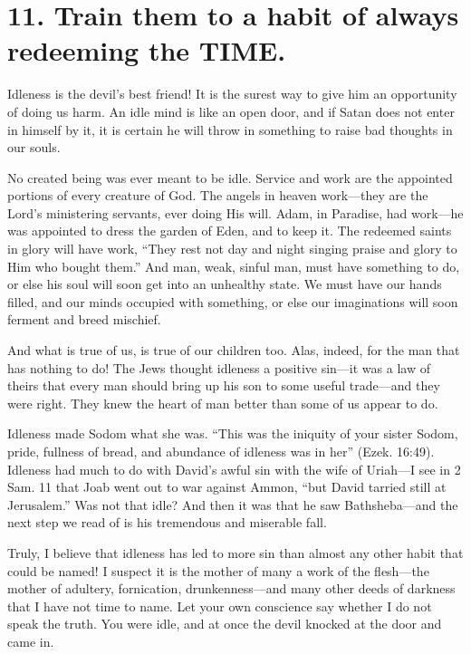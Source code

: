 \documentclass[
]{book}
\begin{document}
\hypertarget{train-them-to-a-habit-of-always-redeeming-the-time.}{%
\section*{11. Train them to a habit of always redeeming the TIME.}\label{train-them-to-a-habit-of-always-redeeming-the-time.}}

Idleness is the devil's best friend! It is the surest way to give him an opportunity of doing us harm. An idle mind is like an open door, and if Satan does not enter in himself by it, it is certain he will throw in something to raise bad thoughts in our souls.

No created being was ever meant to be idle. Service and work are the appointed portions of every creature of God. The angels in heaven work---they are the Lord's ministering servants, ever doing His will. Adam, in Paradise, had work---he was appointed to dress the garden of Eden, and to keep it. The redeemed saints in glory will have work, ``They rest not day and night singing praise and glory to Him who bought them.'' And man, weak, sinful man, must have something to do, or else his soul will soon get into an unhealthy state. We must have our hands filled, and our minds occupied with something, or else our imaginations will soon ferment and breed mischief.

And what is true of us, is true of our children too. Alas, indeed, for the man that has nothing to do! The Jews thought idleness a positive sin---it was a law of theirs that every man should bring up his son to some useful trade---and they were right. They knew the heart of man better than some of us appear to do.

Idleness made Sodom what she was. ``This was the iniquity of your sister Sodom, pride, fullness of bread, and abundance of idleness was in her'' (Ezek. 16:49). Idleness had much to do with David's awful sin with the wife of Uriah---I see in 2 Sam. 11 that Joab went out to war against Ammon, ``but David tarried still at Jerusalem.'' Was not that idle? And then it was that he saw Bathsheba---and the next step we read of is his tremendous and miserable fall.

Truly, I believe that idleness has led to more sin than almost any other habit that could be named! I suspect it is the mother of many a work of the flesh---the mother of adultery, fornication, drunkenness---and many other deeds of darkness that I have not time to name. Let your own conscience say whether I do not speak the truth. You were idle, and at once the devil knocked at the door and came in.
\end{document}
